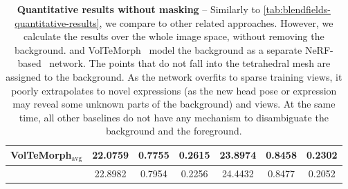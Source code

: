 \begin{table}[!t]
{\begin{tabular}{lcccccc}
      VolTeMorph$_\text{avg}$\cite{garbin2024voltemorph} & \cellcolor{secondbestcolor}22.0759     & \cellcolor{secondbestcolor}0.7755        & \cellcolor{secondbestcolor}0.2615 & \cellcolor{secondbestcolor}23.8974 & \cellcolor{secondbestcolor}0.8458 & 0.2302                            \\
      \midrule
      \textbf{\methodname{}}                             & \cellcolor{firstbestcolor}22.8982      & \cellcolor{firstbestcolor}0.7954         & \cellcolor{firstbestcolor}0.2256  & \cellcolor{firstbestcolor}24.4432  & \cellcolor{firstbestcolor}0.8477  & \cellcolor{firstbestcolor}0.2052  \\
      \bottomrule
    \end{tabular}
  }
  \caption{\textbf{Quantitative results without masking} --
    Similarly to \cref{tab:blendfields-quantitative-results}, we compare \blendfields to other related approaches.
    However, we calculate the results over the whole image space, without
    removing the background.
    \blendfields and VolTeMorph~\cite{garbin2024voltemorph} model the background as a separate NeRF-based~\cite{mildenhall2020nerf} network.
    The points that do not fall into the tetrahedral mesh are assigned to the
    background.
    As the network overfits to sparse training views, it poorly extrapolates
    to novel expressions (as the new head pose or expression may reveal some
    unknown parts of the background) and views.
    At the same time, all other baselines do not have any mechanism to
    disambiguate the background and the foreground.
  }
  \label{tab:blendfields-quantitative-results-without-masking}
\end{table}